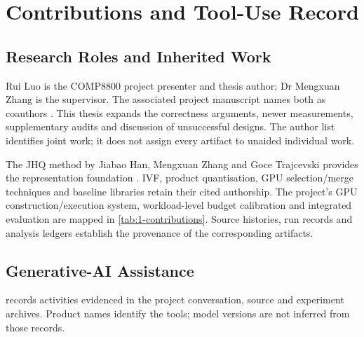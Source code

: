 \chapter{Contributions and Tool-Use Record}
\label{app:author-tools}
\begingroup{}
\section{Research Roles and Inherited Work}
Rui Luo is the COMP8800 project presenter and thesis author;
Dr Mengxuan Zhang is the supervisor. The associated project manuscript
names both as coauthors \cite{adc_artifact}. This thesis expands the
correctness arguments, newer measurements, supplementary audits and
discussion of unsuccessful designs. The author list identifies joint
work; it does not assign every artifact to unaided individual work.

The JHQ method by Jiabao Han, Mengxuan Zhang and Goce Trajcevski provides
the representation foundation \cite{jhq}. IVF, product quantisation,
GPU selection/merge techniques and baseline libraries retain their cited
authorship. The project's GPU construction/execution system, workload-level
budget calibration and integrated evaluation are mapped in
\cref{tab:1-contributions}. Source histories, run records and analysis
ledgers establish the provenance of the corresponding artifacts.

\section{Generative-AI Assistance}
 records activities evidenced in the project conversation,
source and experiment archives. Product names identify the tools;
model versions are not inferred from those records.

